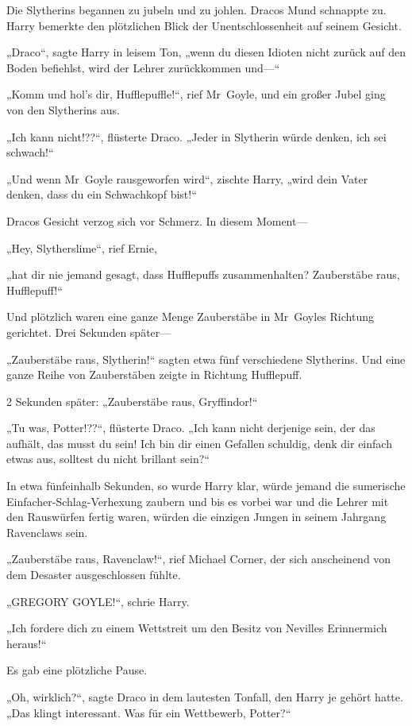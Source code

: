 {Die Slytherins begannen zu jubeln und zu johlen. Dracos Mund schnappte zu. Harry bemerkte den plötzlichen Blick der Unentschlossenheit auf seinem Gesicht.

„Draco“, sagte Harry in leisem Ton, „wenn du diesen Idioten nicht zurück auf den Boden befiehlst, wird der Lehrer zurückkommen und—“

„Komm und hol's dir, Hufflepuffle!“, rief Mr~Goyle, und ein großer Jubel ging von den Slytherins aus.

„Ich kann nicht!??“, flüsterte Draco. „Jeder in Slytherin würde denken, ich sei schwach!“

„Und wenn Mr~Goyle rausgeworfen wird“, zischte Harry, „wird dein Vater denken, dass du ein Schwachkopf bist!“

Dracos Gesicht verzog sich vor Schmerz. In diesem Moment—

„Hey, Slytherslime“, rief Ernie,

„hat dir nie jemand gesagt, dass Hufflepuffs zusammenhalten? Zauberstäbe raus, Hufflepuff!“

Und plötzlich waren eine ganze Menge Zauberstäbe in Mr~Goyles Richtung gerichtet. Drei Sekunden später—

„Zauberstäbe raus, Slytherin!“ sagten etwa fünf verschiedene Slytherins. Und eine ganze Reihe von Zauberstäben zeigte in Richtung Hufflepuff.

2 Sekunden später: „Zauberstäbe raus, Gryffindor!“

„Tu was, Potter!??“, flüsterte Draco. „Ich kann nicht derjenige sein, der das aufhält, das musst du sein! Ich bin dir einen Gefallen schuldig, denk dir einfach etwas aus, solltest du nicht brillant sein?“

In etwa fünfeinhalb Sekunden, so wurde Harry klar, würde jemand die sumerische Einfacher-Schlag-Verhexung zaubern und bis es vorbei war und die Lehrer mit den Rauswürfen fertig waren, würden die einzigen Jungen in seinem Jahrgang Ravenclaws sein.

„Zauberstäbe raus, Ravenclaw!“, rief Michael Corner, der sich anscheinend von dem Desaster ausgeschlossen fühlte.

„GREGORY GOYLE!“, schrie Harry.

„Ich fordere dich zu einem Wettstreit um den Besitz von Nevilles Erinnermich heraus!“

Es gab eine plötzliche Pause.

„Oh, wirklich?“, sagte Draco in dem lautesten Tonfall, den Harry je gehört hatte. „Das klingt interessant. Was für ein Wettbewerb, Potter?“

}
